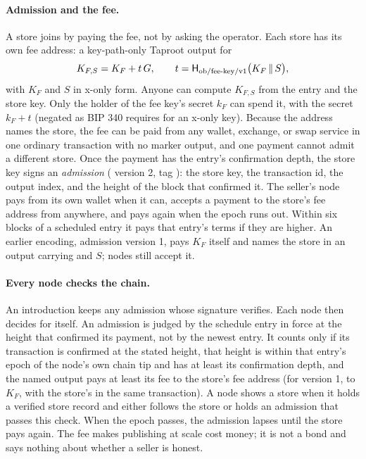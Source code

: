 \paragraph{Admission and the fee.} A store joins by paying the fee, not by asking the operator. Each store has its own fee address: a key-path-only Taproot output for
\[
  K_{F,S} = K_F + t\,G,\qquad t = \mathsf{H}_{\mathrm{ob/fee\text{-}key/v1}}\bigl(K_F \,\|\, S\bigr),
\]
with $K_F$ and $S$ in x-only form. Anyone can compute $K_{F,S}$ from the entry and the store key. Only the holder of the fee key's secret $k_F$ can spend it, with the secret $k_F+t$ (negated as BIP 340 requires for an x-only key). Because the address names the store, the fee can be paid from any wallet, exchange, or swap service in one ordinary transaction with no marker output, and one payment cannot admit a different store. Once the payment has the entry's confirmation depth, the store key signs an \emph{admission} ( version 2, tag ): the store key, the transaction id, the output index, and the height of the block that confirmed it. The seller's node pays from its own wallet when it can, accepts a payment to the store's fee address from anywhere, and pays again when the epoch runs out. Within six blocks of a scheduled entry it pays that entry's terms if they are higher. An earlier encoding, admission version 1, pays $K_F$ itself and names the store in an  output carrying  and $S$; nodes still accept it.

\paragraph{Every node checks the chain.} An introduction keeps any admission whose signature verifies. Each node then decides for itself. An admission is judged by the schedule entry in force at the height that confirmed its payment, not by the newest entry. It counts only if its transaction is confirmed at the stated height, that height is within that entry's epoch of the node's own chain tip and has at least its confirmation depth, and the named output pays at least its fee to the store's fee address (for version 1, to $K_F$, with the store's  in the same transaction). A node shows a store when it holds a verified store record and either follows the store or holds an admission that passes this check. When the epoch passes, the admission lapses until the store pays again. The fee makes publishing at scale cost money; it is not a bond and says nothing about whether a seller is honest.

